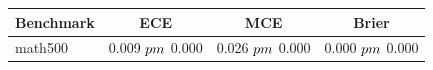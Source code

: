 \begin{tabular}{lccc}
\toprule
Benchmark & ECE & MCE & Brier \\
\midrule
math500 & 0.009 $\\pm$ 0.000 & 0.026 $\\pm$ 0.000 & 0.000 $\\pm$ 0.000 \\
\bottomrule
\end{tabular}
